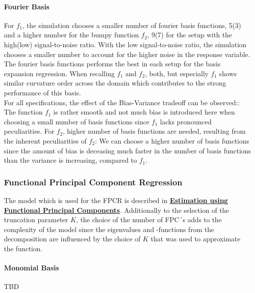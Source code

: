 \documentclass[11pt,twoside,a4paper]{article}
\begin{document}
	\paragraph{Fourier Basis}
	For $f_1$, the simulation chooses a smaller number of fourier basis functions, 5(3) and a higher number for the bumpy function $f_2$, 9(7) for the setup with the high(low) signal-to-noise ratio. With the low signal-to-noise ratio, the simulation chooses a smaller number to account for the higher noise in the response variable. The fourier basis functions performs the best in each setup for the basis expansion regression. When recalling $f_1$ and $f_2$, both, but especially $f_1$ shows similar curvature order across the domain which contributes to the strong performance of this basis.
	\\
	
	
	For all specifications, the effect of the Bias-Variance tradeoff can be observed:: The function $f_1$ is rather smooth and not much bias is introduced here when choosing a small number of basis functions since $f_1$ lacks pronounced peculiarities. For $f_2$, higher number of basis functions are needed, resulting from the inherent peculiarities of $f_2$: We can choose a higher number of basis functions since the amount of bias is deceasing much faster in the number of basis functions than the variance is increasing, compared to $f_1$. 
	
	
	
	\subsubsection{Functional Principal Component Regression}
	The model which is used for the FPCR is described in \hyperref[fpc_exp_transf]{\textbf{Estimation using Functional Principal Components}}. Additionally to the selection of the truncation parameter $K$, the choice of the number of FPC´s adds to the complexity of the model since the eigenvalues and -functions from the decomposition are influenced by the choice of $K$ that was used to approximate the function.
	

	
	\paragraph{Monomial Basis}
	TBD
\end{document}

